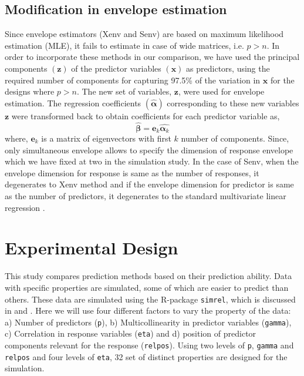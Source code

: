 \documentclass[12pt,3p,authoryear]{elsarticle}
\begin{document}
\subsection{Modification in envelope
estimation}\label{modification-in-envelope-estimation}

Since envelope estimators (Xenv and Senv) are based on maximum
likelihood estimation (MLE), it fails to estimate in case of wide
matrices, i.e. \(p > n\). In order to incorporate these methods in our
comparison, we have used the principal components \((\mathbf{z})\) of
the predictor variables \((\mathbf{x})\) as predictors, using the
required number of components for capturing 97.5\% of the variation in
\(\mathbf{x}\) for the designs where \(p > n\). The new set of
variables, \(\mathbf{z}\), were used for envelope estimation. The
regression coefficients \((\hat{\boldsymbol{\alpha}})\) corresponding to
these new variables \(\mathbf{z}\) were transformed back to obtain
coefficients for each predictor variable as,
\[\hat{\boldsymbol{\beta}} = \mathbf{e}_k\hat{\boldsymbol{\alpha}_k}\]
where, \(\mathbf{e}_k\) is a matrix of eigenvectors with first \(k\)
number of components. Since, only simultaneous envelope allows to
specify the dimension of response envelope which we have fixed at two in
the simulation study. In the case of Senv, when the envelope dimension
for response is same as the number of responses, it degenerates to Xenv
method and if the envelope dimension for predictor is same as the number
of predictors, it degenerates to the standard multivariate linear
regression \citep{env2018}.

\hypertarget{experimental-design}{\section{Experimental
Design}\label{experimental-design}}

This study compares prediction methods based on their prediction
ability. Data with specific properties are simulated, some of which are
easier to predict than others. These data are simulated using the
R-package \texttt{simrel}, which is discussed in \citet{saebo2015simrel}
and \citet{Rimal2018}. Here we will use four different factors to vary
the property of the data: a) Number of predictors (\texttt{p}), b)
Multicollinearity in predictor variables (\texttt{gamma}), c)
Correlation in response variables (\texttt{eta}) and d) position of
predictor components relevant for the response (\texttt{relpos}). Using
two levels of \texttt{p}, \texttt{gamma} and \texttt{relpos} and four
levels of \texttt{eta}, 32 set of distinct properties are designed for
the simulation.
\end{document}
